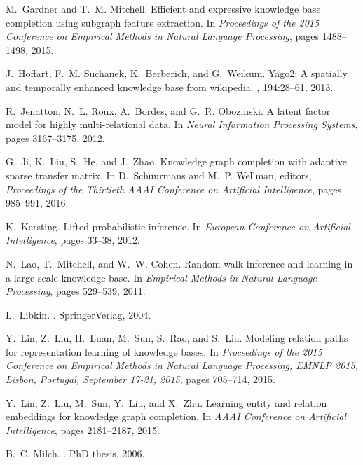 \documentclass{article}
\begin{document}
\begin{thebibliography}{10}
M.~Gardner and T.~M. Mitchell.
\newblock Efficient and expressive knowledge base completion using subgraph
  feature extraction.
\newblock In {\em Proceedings of the 2015 Conference on Empirical Methods in
  Natural Language Processing}, pages 1488--1498, 2015.

J.~Hoffart, F.~M. Suchanek, K.~Berberich, and G.~Weikum.
\newblock Yago2: A spatially and temporally enhanced knowledge base from
  wikipedia.
, 194:28--61, 2013.

R.~Jenatton, N.~L. Roux, A.~Bordes, and G.~R. Obozinski.
\newblock A latent factor model for highly multi-relational data.
\newblock In {\em Neural Information Processing Systems}, pages 3167--3175,
  2012.

G.~Ji, K.~Liu, S.~He, and J.~Zhao.
\newblock Knowledge graph completion with adaptive sparse transfer matrix.
\newblock In D.~Schuurmans and M.~P. Wellman, editors, {\em Proceedings of the
  Thirtieth {AAAI} Conference on Artificial Intelligence}, pages 985--991,
  2016.

K.~Kersting.
\newblock Lifted probabilistic inference.
\newblock In {\em European Conference on Artificial Intelligence}, pages
  33--38, 2012.

N.~Lao, T.~Mitchell, and W.~W. Cohen.
\newblock Random walk inference and learning in a large scale knowledge base.
\newblock In {\em Empirical Methods in Natural Language Processing}, pages
  529--539, 2011.

L.~Libkin.
.
\newblock SpringerVerlag, 2004.

Y.~Lin, Z.~Liu, H.~Luan, M.~Sun, S.~Rao, and S.~Liu.
\newblock Modeling relation paths for representation learning of knowledge
  bases.
\newblock In {\em Proceedings of the 2015 Conference on Empirical Methods in
  Natural Language Processing, {EMNLP} 2015, Lisbon, Portugal, September 17-21,
  2015}, pages 705--714, 2015.

Y.~Lin, Z.~Liu, M.~Sun, Y.~Liu, and X.~Zhu.
\newblock Learning entity and relation embeddings for knowledge graph
  completion.
\newblock In {\em AAAI Conference on Artificial Intelligence}, pages
  2181--2187, 2015.

B.~C. Milch.
.
\newblock PhD thesis, 2006.


\end{thebibliography}
\end{document}
